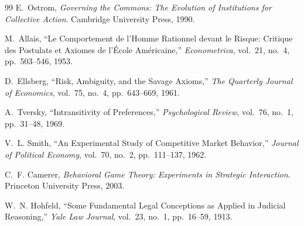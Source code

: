 \documentclass[12pt]{article}
\theoremstyle{definition}
\theoremstyle{remark}
\begin{document}
\begin{thebibliography}{99}
E.~Ostrom, \emph{Governing the Commons: The Evolution of Institutions for Collective Action}. Cambridge University Press, 1990.

M.~Allais, ``Le Comportement de l'Homme Rationnel devant le Risque: Critique des Postulats et Axiomes de l'\'{E}cole Am\'{e}ricaine,'' \emph{Econometrica}, vol.~21, no.~4, pp.~503--546, 1953.

D.~Ellsberg, ``Risk, Ambiguity, and the Savage Axioms,'' \emph{The Quarterly Journal of Economics}, vol.~75, no.~4, pp.~643--669, 1961.

A.~Tversky, ``Intransitivity of Preferences,'' \emph{Psychological Review}, vol.~76, no.~1, pp.~31--48, 1969.

V.~L. Smith, ``An Experimental Study of Competitive Market Behavior,'' \emph{Journal of Political Economy}, vol.~70, no.~2, pp.~111--137, 1962.

C.~F. Camerer, \emph{Behavioral Game Theory: Experiments in Strategic Interaction}. Princeton University Press, 2003.

W.~N. Hohfeld, ``Some Fundamental Legal Conceptions as Applied in Judicial Reasoning,'' \emph{Yale Law Journal}, vol.~23, no.~1, pp.~16--59, 1913.

\end{thebibliography}
\end{document}
